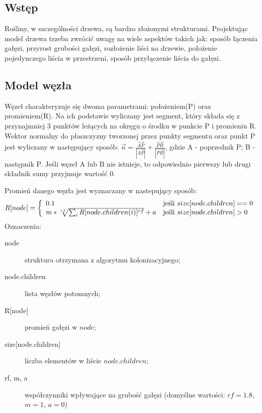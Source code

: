 \subsection{Wstęp}
Rośliny, w szczególności drzewa, są bardzo złożonymi strukturami. Projektując model drzewa trzeba zwrócić uwagę na wiele aspektów takich jak: sposób łączenia gałęzi, przyrost grubości gałęzi, rozłożenie liści na drzewie, położenie pojedynczego liścia w przestrzeni, sposób przyłączenie liścia do gałęzi.


\subsection{Model węzła}
Węzeł charakteryzuje się dwoma parametrami: położeniem(P) oraz promieniem(R). Na ich podstawie wyliczany jest segment, który składa się z przynajmniej 3 punktów leżących na okręgu o środku w punkcie P i promieniu R. Wektor normalny do płaszczyzny tworzonej przez punkty segmentu oraz punkt P jest wyliczany w następujący sposób: $\vec{n}=\frac{\vec{AP}}{|\vec{AP}|}+\frac{\vec{PB}}{|\vec{PB}|}$, gdzie A - poprzednik P; B - następnik P. Jeśli węzeł A lub B nie istnieje, to odpowiednio pierwszy lub drugi składnik sumy przyjmuje wartość 0.

Promień danego węzła jest wyznaczany w nastepujący sposób:
$$
  R[node] = \left\{ 
  \begin{array}{l l}
    0.1 & \textrm{jeśli $size[node.children] == 0$}\\
    m*\sqrt[rf]{\sum_{i} R[node.children(i)]^{rf}}+a & \textrm{jeśli $size[node.children] > 0$}\\
  \end{array} \right.
$$
Oznaczenia:
\begin{description}
	\item[node] struktura otrzymana z algorytmu kolonizacyjnego;
	\item[node.children] lista węzłów potomnych;
	\item[\textrm{R[node]}] promień gałęzi w $node$;
	\item[\textrm{size[node.children]}] liczba elementów w liście $node.children$;
	\item[rf, m, a] współczynniki wpływające na grubość gałęzi (domyślne wartości: $rf=1.8$, $m=1$, $a=0$)
\end{description}

